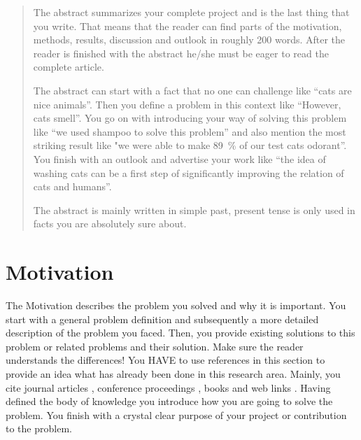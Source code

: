 \documentclass[conference]{IEEEtran}
\begin{document}




\maketitle


\begin{abstract}

The abstract summarizes your complete project and is the last thing that you write. That means that the reader can find parts of the motivation, methods, results, discussion and outlook in roughly 200 words. After the reader is finished with the abstract he/she must be eager to read the complete article. 

The abstract can start with a fact that no one can challenge like ``cats are nice animals''. Then you define a problem in this context like ``However, cats smell''. You go on with introducing your way of solving this problem like ``we used shampoo to solve this problem'' and also mention the most striking result like "we were able to make 89~\% of our test cats odorant''. You finish with an outlook and advertise your work like ``the idea of washing cats can be a first step of significantly improving the relation of cats and humans''. 

The abstract is mainly written in simple past, present tense is only used in facts you are absolutely sure about.

\end{abstract}


%
\IEEEpeerreviewmaketitle



\section{Motivation}
The Motivation describes the problem you solved and why it is important. You start with a general problem definition and subsequently a more detailed description of the problem you faced. Then, you provide existing solutions to this problem or related problems and their solution. Make sure the reader understands the differences! You HAVE to use references in this section to provide an idea what has already been done in this research area. Mainly, you cite journal articles \cite{JournalArticle}, conference proceedings \cite{ProceedingsArticle}, books \cite{Book} and web links \cite{Weblink}. Having defined the body of knowledge you introduce how you are going to solve the problem. You finish with a crystal clear purpose of your project or contribution to the problem.
\end{document}
